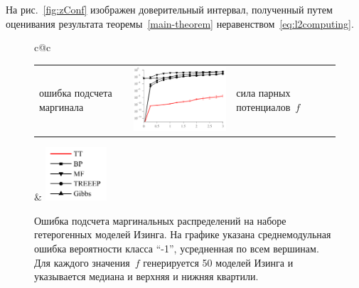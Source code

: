 
На рис.~\ref{fig:zConf} изображен доверительный интервал, полученный путем оценивания результата теоремы~\ref{main-theorem} неравенством~\eqref{eq:l2computing}.


\begin{figure}
\begin{center}
\begin{tabular}{c@{\!\!\!}c}
\begin{tabular}{m{0.3cm}@{}m{6.5cm}}
\begin{sideways}\parbox{4cm}{\centering\scriptsize  ошибка подсчета маргинала }\end{sideways}
& \includegraphics[width=6.5cm]{images/strong_mixed_spinglass_50_marginals_comparison_v3.pdf}
& \parbox[t][0.5cm][t]{6.8cm}{\centering\scriptsize сила парных потенциалов~$f$ }
\end{tabular}
&
\includegraphics[width=2.3cm]{images/legend_marginals_v3.pdf}
\end{tabular}
\end{center}
\caption{Ошибка подсчета маргинальных распределений на наборе гетерогенных моделей Изинга. На графике указана среднемодульная ошибка вероятности класса ``-1'', усредненная по всем вершинам. Для каждого значения~$f$ генерируется 50 моделей Изинга и указывается медиана и верхняя и нижняя квартили.
 \label{fig:marginals}}
\end{figure}

